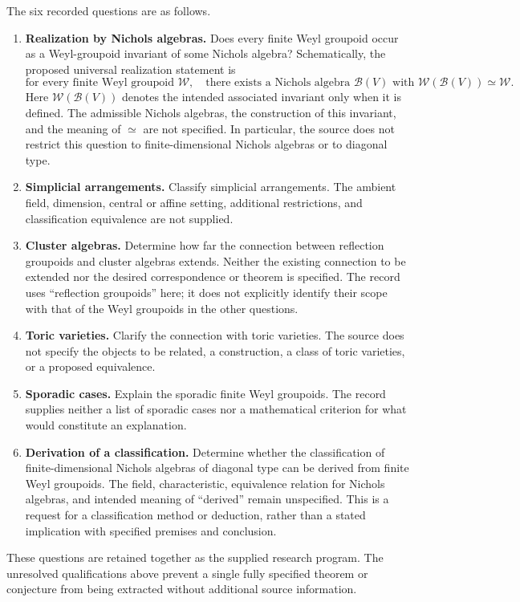 \documentclass[11pt]{article}
\begin{document}
The six recorded questions are as follows.
\begin{enumerate}
\item \textbf{Realization by Nichols algebras.} Does every finite Weyl groupoid occur as a Weyl-groupoid invariant of some Nichols algebra? Schematically, the proposed universal realization statement is
\[
\text{for every finite Weyl groupoid }\mathcal W,\quad
\text{there exists a Nichols algebra }\mathcal B(V)
\text{ with }\mathcal W(\mathcal B(V))\simeq\mathcal W.
\]
Here \(\mathcal W(\mathcal B(V))\) denotes the intended associated invariant only when it is defined. The admissible Nichols algebras, the construction of this invariant, and the meaning of \(\simeq\) are not specified. In particular, the source does not restrict this question to finite-dimensional Nichols algebras or to diagonal type.
\item \textbf{Simplicial arrangements.} Classify simplicial arrangements. The ambient field, dimension, central or affine setting, additional restrictions, and classification equivalence are not supplied.
\item \textbf{Cluster algebras.} Determine how far the connection between reflection groupoids and cluster algebras extends. Neither the existing connection to be extended nor the desired correspondence or theorem is specified. The record uses ``reflection groupoids'' here; it does not explicitly identify their scope with that of the Weyl groupoids in the other questions.
\item \textbf{Toric varieties.} Clarify the connection with toric varieties. The source does not specify the objects to be related, a construction, a class of toric varieties, or a proposed equivalence.
\item \textbf{Sporadic cases.} Explain the sporadic finite Weyl groupoids. The record supplies neither a list of sporadic cases nor a mathematical criterion for what would constitute an explanation.
\item \textbf{Derivation of a classification.} Determine whether the classification of finite-dimensional Nichols algebras of diagonal type can be derived from finite Weyl groupoids. The field, characteristic, equivalence relation for Nichols algebras, and intended meaning of ``derived'' remain unspecified. This is a request for a classification method or deduction, rather than a stated implication with specified premises and conclusion.
\end{enumerate}
These questions are retained together as the supplied research program. The unresolved qualifications above prevent a single fully specified theorem or conjecture from being extracted without additional source information.
\end{document}
